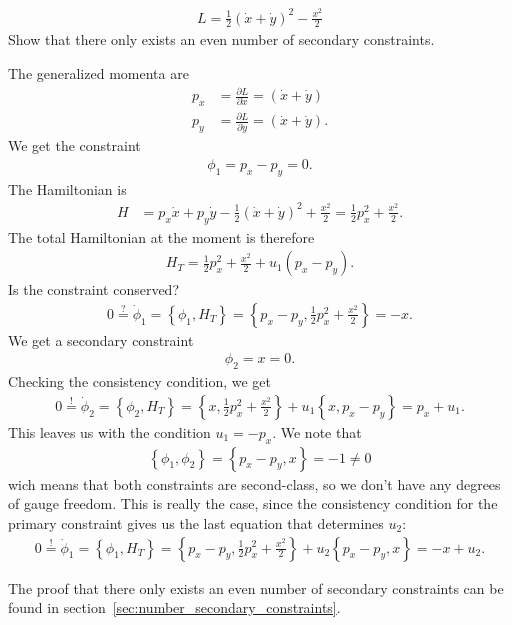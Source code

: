 \begin{exercise}
\begin{align*}
L = \frac{1}{2} (\dot{x} + \dot{y})^2 - \frac{x^2}{2}
\end{align*}
Show that there only exists an even number of secondary constraints.
\end{exercise}
\begin{solution}
The generalized momenta are
\begin{align*}
p_x &= \frac{\partial L}{\partial \dot{x}} = (\dot{x} + \dot{y}) \\
p_y &= \frac{\partial L}{\partial \dot{y}} = (\dot{x} + \dot{y}).
\end{align*}
We get the constraint 
\begin{align*}
\phi_1 = p_x - p_y = 0.
\end{align*}
The Hamiltonian is
\begin{align*}
H &= p_x \dot{x} + p_y \dot{y} - \frac{1}{2} (\dot{x} + \dot{y})^2 + \frac{x^2}{2} = \frac{1}{2} p_x^2 + \frac{x^2}{2}.
\end{align*}
The total Hamiltonian at the moment is therefore
\begin{align*}
H_T = \frac{1}{2} p_x^2 + \frac{x^2}{2} + u_1 (p_x - p_y).
\end{align*}
Is the constraint conserved?
\begin{align*}
0 \overset{?}{=} \dot{\phi}_1 = \left \{ \phi_1,H_T \right \} = \left \{ p_x - p_y,\frac{1}{2} p_x^2 + \frac{x^2}{2} \right \} = - x.
\end{align*}
We get a secondary constraint 
\begin{align*}
\phi_2 = x = 0.
\end{align*}
Checking the consistency condition, we get
\begin{align*}
0 \overset{!}{=} \dot{\phi}_2 = \left \{ \phi_2,H_T \right \} = \left \{ x,\frac{1}{2} p_x^2 + \frac{x^2}{2} \right \} + u_1 \left \{ x,p_x - p_y \right \} = p_x + u_1.
\end{align*}
This leaves us with the condition $u_1 = - p_x$. We note that 
\begin{align*}
\left \{ \phi_1,\phi_2 \right \} = \left \{ p_x - p_y,x \right \} = - 1 \neq 0
\end{align*}
wich means that both constraints are second-class, so we don't have any degrees of gauge freedom. This is really the case, since the consistency condition for the primary constraint gives us the last equation that determines $u_2$:
\begin{align*}
0 \overset{!}{=} \dot{\phi}_1 = \left \{ \phi_1,H_T \right \} = \left \{ p_x - p_y,\frac{1}{2} p_x^2 + \frac{x^2}{2} \right \} + u_2 \left \{ p_x - p_y,x \right \} = - x + u_2.
\end{align*}

The proof that there only exists an even number of secondary constraints can be found in section~\vref{sec:number_secondary_constraints}.
\end{solution}

